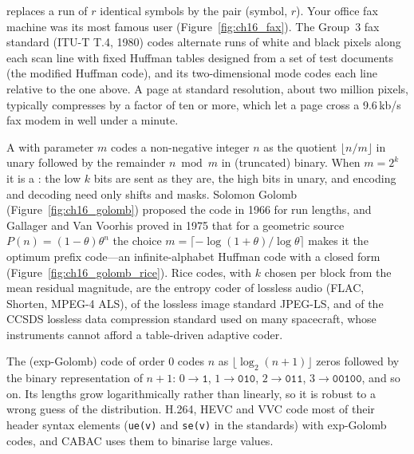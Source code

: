  replaces a run of $r$ identical symbols by the pair (symbol, $r$). Your
office fax machine was its most famous user (Figure~\ref{fig:ch16_fax}). The Group~3 fax standard (ITU-T T.4, 1980) codes
alternate runs of white and black pixels along each scan line with fixed Huffman tables designed
from a set of test documents (the modified Huffman code), and its two-dimensional mode codes each
line relative to the one above. A page at standard resolution, about two million pixels, typically
compresses by a factor of ten or more, which let a page cross a 9.6\,kb/s fax modem in well under a
minute.



A  with parameter $m$ codes a non-negative integer $n$ as the quotient
$\lfloor n/m\rfloor$ in unary followed by the remainder $n\bmod m$ in (truncated) binary. When
$m=2^k$ it is a : the low $k$ bits are sent as they are, the high bits in unary,
and encoding and decoding need only shifts and masks. Solomon Golomb (Figure~\ref{fig:ch16_golomb}) proposed the code in 1966 for
run lengths, and Gallager and Van Voorhis proved in 1975 that for a geometric source
$P(n)=(1-\theta)\theta^n$ the choice $m=\lceil-\log(1+\theta)/\log\theta\rceil$ makes it the optimum
prefix code---an infinite-alphabet Huffman code with a closed form
(Figure~\ref{fig:ch16_golomb_rice}). Rice codes, with $k$ chosen per block from the mean residual
magnitude, are the entropy coder of lossless audio (FLAC, Shorten, MPEG-4 ALS), of the lossless
image standard JPEG-LS, and of the CCSDS lossless data compression standard used on many
spacecraft, whose instruments cannot afford a table-driven adaptive coder.

The  (exp-Golomb) code of order 0 codes $n$ as $\lfloor\log_2(n+1)\rfloor$
zeros followed by the binary representation of $n+1$: $0\to\texttt{1}$, $1\to\texttt{010}$,
$2\to\texttt{011}$, $3\to\texttt{00100}$, and so on. Its lengths grow logarithmically rather than
linearly, so it is robust to a wrong guess of the distribution. H.264, HEVC and VVC code most of
their header syntax elements (\texttt{ue(v)} and \texttt{se(v)} in the standards) with exp-Golomb
codes, and CABAC uses them to binarise large values.


